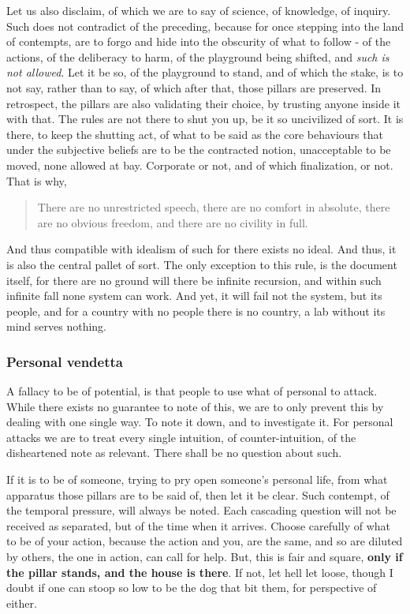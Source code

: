 \documentclass[10pt,a4paper]{article}
\begin{document}
Let us also disclaim, of which we are to say of science, of knowledge, of inquiry. Such does not contradict of the preceding, because for once stepping into the land of contempts, are to forgo and hide into the obscurity of what to follow - of the actions, of the deliberacy to harm, of the playground being shifted, and \textit{such is not allowed}. Let it be so, of the playground to stand, and of which the stake, is to not say, rather than to say, of which after that, those pillars are preserved. In retrospect, the pillars are also validating their choice, by trusting anyone inside it with that. The rules are not there to shut you up, be it so uncivilized of sort. It is there, to keep the shutting act, of what to be said as the core behaviours that under the subjective beliefs are to be the contracted notion, unacceptable to be moved, none allowed at bay. Corporate or not, and of which finalization, or not. That is why, 

\begin{quote}
    There are no unrestricted speech, there are no comfort in absolute, there are no obvious freedom, and there are no civility in full. 
\end{quote}

And thus compatible with idealism of such for there exists no ideal. And thus, it is also the central pallet of sort. The only exception to this rule, is the document itself, for there are no ground will there be infinite recursion, and within such infinite fall none system can work. And yet, it will fail not the system, but its people, and for a country with no people there is no country, a lab without its mind serves nothing. 

\subsubsection{Personal vendetta}

A fallacy to be of potential, is that people to use what of personal to attack. While there exists no guarantee to note of this, we are to only prevent this by dealing with one single way. To note it down, and to investigate it. For personal attacks we are to treat every single intuition, of counter-intuition, of the disheartened note as relevant. There shall be no question about such. 

If it is to be of someone, trying to pry open someone's personal life, from what apparatus those pillars are to be said of, then let it be clear. Such contempt, of the temporal pressure, will always be noted. Each cascading question will not be received as separated, but of the time when it arrives. Choose carefully of what to be of your action, because the action and you, are the same, and so are diluted by others, the one in action, can call for help. But, this is fair and square, \textbf{only if the pillar stands, and the house is there}. If not, let hell let loose, though I doubt if one can stoop so low to be the dog that bit them, for perspective of either. 
\end{document}
